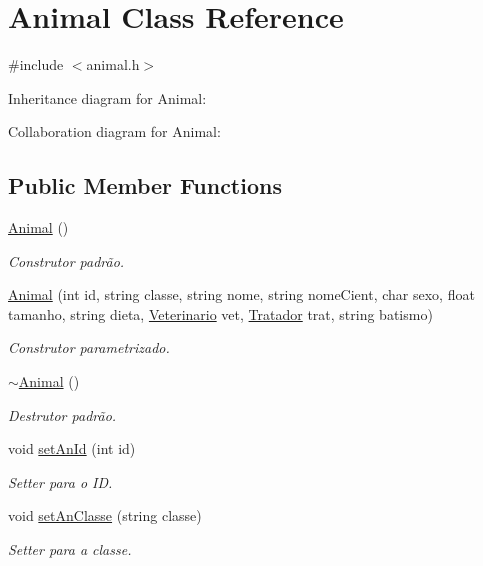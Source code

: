\hypertarget{classAnimal}{}\section{Animal Class Reference}
\label{classAnimal}


{\ttfamily \#include $<$animal.\+h$>$}



Inheritance diagram for Animal\+:


Collaboration diagram for Animal\+:
\subsection*{Public Member Functions}
\begin{DoxyCompactItemize}
\item 
\hyperlink{classAnimal_a1e726a49ec952443190ac62dad22353c}{Animal} ()
\begin{DoxyCompactList}\small\item\em Construtor padrão. \end{DoxyCompactList}\item 
\hyperlink{classAnimal_a2336a70f8816269adabb814c876f36a5}{Animal} (int id, string classe, string nome, string nome\+Cient, char sexo, float tamanho, string dieta, \hyperlink{classVeterinario}{Veterinario} vet, \hyperlink{classTratador}{Tratador} trat, string batismo)
\begin{DoxyCompactList}\small\item\em Construtor parametrizado. \end{DoxyCompactList}\item 
\hyperlink{classAnimal_a476af25adde5f0dfa688129c8f86fa5c}{$\sim$\+Animal} ()
\begin{DoxyCompactList}\small\item\em Destrutor padrão. \end{DoxyCompactList}\item 
void \hyperlink{classAnimal_acec30bb98d54e4f838619c6b300ec64a}{set\+An\+Id} (int id)
\begin{DoxyCompactList}\small\item\em Setter para o ID. \end{DoxyCompactList}\item 
void \hyperlink{classAnimal_a3408e2ea8624789f41d04e994fc7c004}{set\+An\+Classe} (string classe)
\begin{DoxyCompactList}\small\item\em Setter para a classe. \end{DoxyCompactList}\item 

\end{DoxyCompactItemize}
